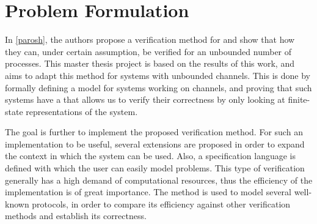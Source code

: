 
\section{Problem Formulation}
In \ref{parosh}, the authors propose a verification method for  and show that how they can, under certain assumption, be verified for an unbounded number of processes. This master thesis project is based on the results of this work, and aims to adapt this method for systems with unbounded channels. This is done by formally defining a model for systems working on channels, and proving that such systems have a  that allows us to verify their correctness by only looking at finite-state representations of the system.

The goal is further to implement the proposed verification method. For such an implementation to be useful, several extensions are proposed in order to expand the context in which the system can be used. Also, a specification language is defined with which the user can easily model problems. This type of verification generally has a high demand of computational resources, thus the efficiency of the implementation is of great importance. The method is used to model several well-known protocols, in order to compare its efficiency against other verification methods and establish its correctness.
